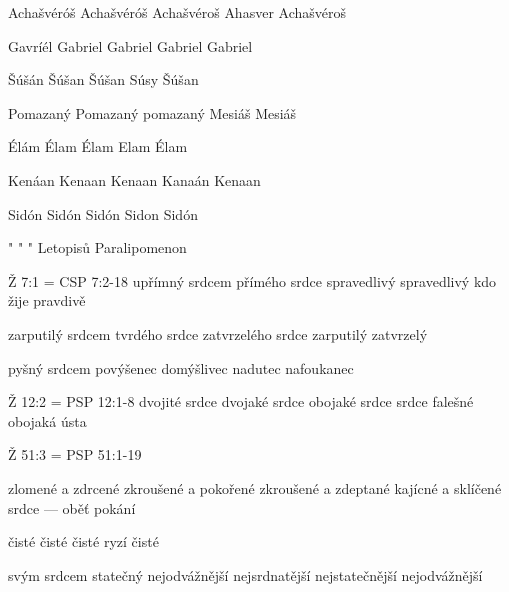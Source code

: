  {Achašvéróš} {Achašvéróš} {Achašvéroš} {Ahasver} {Achašvéroš}

 {Gavríél} {Gabriel} {Gabriel} {Gabriel} {Gabriel}


 {Šúšán} {Šúšan} {Šúšan} {Súsy} {Šúšan} %

 {Pomazaný} {Pomazaný} {pomazaný} {Mesiáš} {Mesiáš}

  {Élám} {Élam}  {Élam} {Elam} {Élam} 

        {Kenáan}  %
        {Kenaan}  %
        {Kenaan}  %
        {Kanaán}  %
        {Kenaan}  %

 {Sidón} {Sidón} {Sidón} {Sidon} {Sidón}

 {"} {"} {"} {Letopisů} {Paralipomenon}

\renum Ž 7:1 = CSP 7:2-18
        {upřímný srdcem}  %
        {přímého srdce}  %
        {spravedlivý}  %
        {spravedlivý}  %
        {kdo žije pravdivě}  %

        {zarputilý srdcem}  %
        {tvrdého srdce}  %
        {zatvrzelého srdce}  %
        {zarputilý}  %
        {zatvrzelý}  %
   
        {pyšný srdcem}  %
        {povýšenec}  %
        {domýšlivec}  %
        {nadutec}  %
        {nafoukanec}  %


\renum Ž 12:2 = PSP 12:1-8
        {dvojité srdce}  %
        {dvojaké srdce}  %
        {obojaké srdce}  %
        {srdce falešné}  %
        {obojaká ústa}  %
        


\renum Ž 51:3 = PSP 51:1-19
        
        {zlomené a zdrcené}  %
        {zkroušené a pokořené}  %
        {zkroušené a zdeptané}  %
        {kajícné a sklíčené}  %
        {srdce --- oběť pokání}  %
        
        {čisté}  %
        {čisté}  %
        {čisté}  %
        {ryzí}  %
        {čisté}  %
         

        {svým srdcem statečný}  %
        {nejodvážnější}  %
        {nejsrdnatější}  %
        {nejstatečnější}  %
        {nejodvážnější}  %
        

